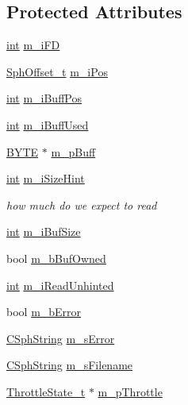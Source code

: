 \subsection*{Protected Attributes}
\begin{DoxyCompactItemize}
\item 
\hyperlink{sphinxexpr_8cpp_a4a26e8f9cb8b736e0c4cbf4d16de985e}{int} \hyperlink{classCSphReader_a0d5e86ee42087578054846c21445bf41}{m\-\_\-i\-F\-D}
\item 
\hyperlink{sphinx_8h_a0fb3b64afebef33c61367714754eaa90}{Sph\-Offset\-\_\-t} \hyperlink{classCSphReader_a5d0133dc1bb7855eb86edccca3bd8ba5}{m\-\_\-i\-Pos}
\item 
\hyperlink{sphinxexpr_8cpp_a4a26e8f9cb8b736e0c4cbf4d16de985e}{int} \hyperlink{classCSphReader_adefae87afa10ec21d4fc279726d0e0f7}{m\-\_\-i\-Buff\-Pos}
\item 
\hyperlink{sphinxexpr_8cpp_a4a26e8f9cb8b736e0c4cbf4d16de985e}{int} \hyperlink{classCSphReader_a1c794ef0fec440a8f875b0a0d46d95a7}{m\-\_\-i\-Buff\-Used}
\item 
\hyperlink{sphinxstd_8h_a4ae1dab0fb4b072a66584546209e7d58}{B\-Y\-T\-E} $\ast$ \hyperlink{classCSphReader_a581e9bc5424d22c1f6f21937eb16c083}{m\-\_\-p\-Buff}
\item 
\hyperlink{sphinxexpr_8cpp_a4a26e8f9cb8b736e0c4cbf4d16de985e}{int} \hyperlink{classCSphReader_a5feb0bda7c40dde5db2ba095a9b82d37}{m\-\_\-i\-Size\-Hint}
\begin{DoxyCompactList}\small\item\em how much do we expect to read \end{DoxyCompactList}\item 
\hyperlink{sphinxexpr_8cpp_a4a26e8f9cb8b736e0c4cbf4d16de985e}{int} \hyperlink{classCSphReader_a423dcf1d90663db923c5befd90450a20}{m\-\_\-i\-Buf\-Size}
\item 
bool \hyperlink{classCSphReader_a482c57dabddec00005f478b0a81bfa68}{m\-\_\-b\-Buf\-Owned}
\item 
\hyperlink{sphinxexpr_8cpp_a4a26e8f9cb8b736e0c4cbf4d16de985e}{int} \hyperlink{classCSphReader_aa084c0b663a446b5f0c489adc55d011b}{m\-\_\-i\-Read\-Unhinted}
\item 
bool \hyperlink{classCSphReader_a17d8e0a174f2322308aebe3ab4553075}{m\-\_\-b\-Error}
\item 
\hyperlink{structCSphString}{C\-Sph\-String} \hyperlink{classCSphReader_af08391a3629b2a3edb11f89adeb87763}{m\-\_\-s\-Error}
\item 
\hyperlink{structCSphString}{C\-Sph\-String} \hyperlink{classCSphReader_a7b8f5f7010d9d6e36af4378709c6935d}{m\-\_\-s\-Filename}
\item 
\hyperlink{structThrottleState__t}{Throttle\-State\-\_\-t} $\ast$ \hyperlink{classCSphReader_adf6c70318950e0bfba22f5928aa51a10}{m\-\_\-p\-Throttle}
\end{DoxyCompactItemize}


